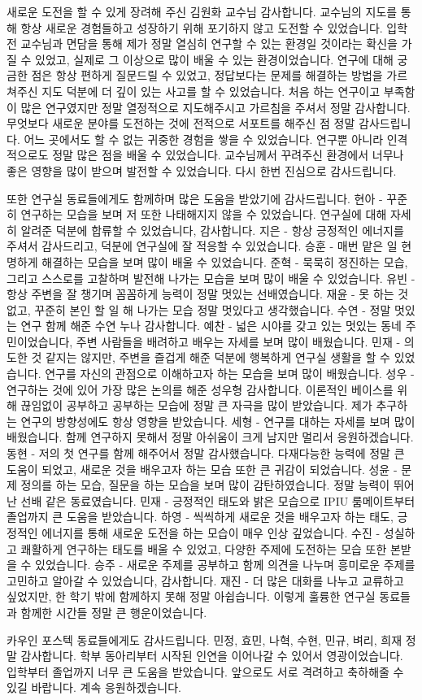 새로운 도전을 할 수 있게 장려해 주신 김원화 교수님 감사합니다.
교수님의 지도를 통해 항상 새로운 경험들하고 성장하기 위해 포기하지 않고 도전할 수 있었습니다.
입학 전 교수님과 면담을 통해 제가 정말 열심히 연구할 수 있는 환경일 것이라는 확신을 가질 수 있었고, 실제로 그 이상으로 많이 배울 수 있는 환경이었습니다.
연구에 대해 궁금한 점은 항상 편하게 질문드릴 수 있었고, 정답보다는 문제를 해결하는 방법을 가르쳐주신 지도 덕분에 더 깊이 있는 사고를 할 수 있었습니다.
처음 하는 연구이고 부족함이 많은 연구였지만 정말 열정적으로 지도해주시고 가르침을 주셔서 정말 감사합니다.
무엇보다 새로운 분야를 도전하는 것에 전적으로 서포트를 해주신 점 정말 감사드립니다.
어느 곳에서도 할 수 없는 귀중한 경험을 쌓을 수 있었습니다.
연구뿐 아니라 인격적으로도 정말 많은 점을 배울 수 있었습니다.
교수님께서 꾸려주신 환경에서 너무나 좋은 영향을 많이 받으며 발전할 수 있었습니다.
다시 한번 진심으로 감사드립니다.

또한 연구실 동료들에게도 함께하며 많은 도움을 받았기에 감사드립니다.
현아 - 꾸준히 연구하는 모습을 보며 저 또한 나태해지지 않을 수 있었습니다. 연구실에 대해 자세히 알려준 덕분에 합류할 수 있었습니다, 감사합니다.
지은 - 항상 긍정적인 에너지를 주셔서 감사드리고, 덕분에 연구실에 잘 적응할 수 있었습니다.
승훈 - 매번 맡은 일 현명하게 해결하는 모습을 보며 많이 배울 수 있었습니다.
준혁 - 묵묵히 정진하는 모습, 그리고 스스로를 고찰하며 발전해 나가는 모습을 보며 많이 배울 수 있었습니다.
유빈 - 항상 주변을 잘 챙기며 꼼꼼하게 능력이 정말 멋있는 선배였습니다.
재윤 - 못 하는 것 없고, 꾸준히 본인 할 일 해 나가는 모습 정말 멋있다고 생각했습니다.
수연 - 정말 멋있는 연구 함께 해준 수연 누나 감사합니다.
예찬 - 넓은 시야를 갖고 있는 멋있는 동네 주민이었습니다, 주변 사람들을 배려하고 배우는 자세를 보며 많이 배웠습니다.
민재 - 의도한 것 같지는 않지만, 주변을 즐겁게 해준 덕분에 행복하게 연구실 생활을 할 수 있었습니다. 연구를 자신의 관점으로 이해하고자 하는 모습을 보며 많이 배웠습니다.
성우 - 연구하는 것에 있어 가장 많은 논의를 해준 성우형 감사합니다. 이론적인 베이스를 위해 끊임없이 공부하고 공부하는 모습에 정말 큰 자극을 많이 받았습니다. 제가 추구하는 연구의 방향성에도 항상 영향을 받았습니다.
세형 - 연구를 대하는 자세를 보며 많이 배웠습니다. 함께 연구하지 못해서 정말 아쉬움이 크게 남지만 멀리서 응원하겠습니다.
동현 - 저의 첫 연구를 함께 해주어서 정말 감사했습니다. 다재다능한 능력에 정말 큰 도움이 되었고, 새로운 것을 배우고자 하는 모습 또한 큰 귀감이 되었습니다.
성윤 - 문제 정의를 하는 모습, 질문을 하는 모습을 보며 많이 감탄하였습니다. 정말 능력이 뛰어난 선배 같은 동료였습니다.
민재 - 긍정적인 태도와 밝은 모습으로 IPIU 룸메이트부터 졸업까지 큰 도움을 받았습니다.
하영 - 씩씩하게 새로운 것을 배우고자 하는 태도, 긍정적인 에너지를 통해 새로운 도전을 하는 모습이 매우 인상 깊었습니다.
수진 - 성실하고 쾌활하게 연구하는 태도를 배울 수 있었고, 다양한 주제에 도전하는 모습 또한 본받을 수 있었습니다.
승주 - 새로운 주제를 공부하고 함께 의견을 나누며 흥미로운 주제를 고민하고 알아갈 수 있었습니다, 감사합니다.
재진 - 더 많은 대화를 나누고 교류하고 싶었지만, 한 학기 밖에 함께하지 못해 정말 아쉽습니다.
이렇게 훌륭한 연구실 동료들과 함께한 시간들 정말 큰 행운이었습니다.

카우인 포스텍 동료들에게도 감사드립니다. 민정, 효민, 나혁, 수현, 민규, 벼리, 희재 정말 감사합니다.
학부 동아리부터 시작된 인연을 이어나갈 수 있어서 영광이었습니다.
입학부터 졸업까지 너무 큰 도움을 받았습니다.
앞으로도 서로 격려하고 축하해줄 수 있길 바랍니다. 
계속 응원하겠습니다.